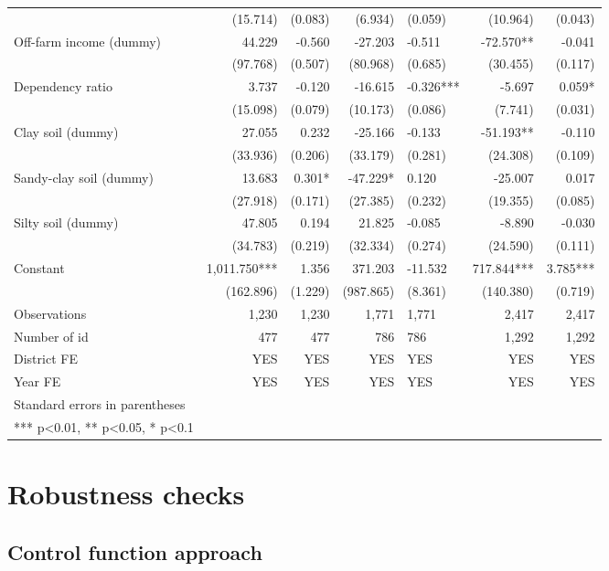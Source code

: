 \documentclass[
]{article}
\begin{document}
\begin{landscape}
\begin{longtable}[t]{lrrrlrr}
 & (15.714) & (0.083) & (6.934) & (0.059) & (10.964) & (0.043)\\
Off-farm income (dummy) & 44.229 & -0.560 & -27.203 & -0.511 & -72.570** & -0.041\\
 & (97.768) & (0.507) & (80.968) & (0.685) & (30.455) & (0.117)\\
Dependency ratio & 3.737 & -0.120 & -16.615 & -0.326*** & -5.697 & 0.059*\\
 & (15.098) & (0.079) & (10.173) & (0.086) & (7.741) & (0.031)\\
Clay soil (dummy) & 27.055 & 0.232 & -25.166 & -0.133 & -51.193** & -0.110\\
 & (33.936) & (0.206) & (33.179) & (0.281) & (24.308) & (0.109)\\
Sandy-clay soil (dummy) & 13.683 & 0.301* & -47.229* & 0.120 & -25.007 & 0.017\\
 & (27.918) & (0.171) & (27.385) & (0.232) & (19.355) & (0.085)\\
Silty soil (dummy) & 47.805 & 0.194 & 21.825 & -0.085 & -8.890 & -0.030\\
 & (34.783) & (0.219) & (32.334) & (0.274) & (24.590) & (0.111)\\
Constant & 1,011.750*** & 1.356 & 371.203 & -11.532 & 717.844*** & 3.785***\\
 & (162.896) & (1.229) & (987.865) & (8.361) & (140.380) & (0.719)\\
Observations & 1,230 & 1,230 & 1,771 & 1,771 & 2,417 & 2,417\\
Number of id & 477 & 477 & 786 & 786 & 1,292 & 1,292\\
District FE & YES & YES & YES & YES & YES & YES\\
Year FE & YES & YES & YES & YES & YES & YES\\
Standard errors in parentheses &  &  &  &  &  & \\
*** p<0.01, ** p<0.05, * p<0.1 &  &  &  &  &  & \\*
\end{longtable}
\endgroup{}
\end{landscape}

\newpage

\hypertarget{robustness-checks}{%
\section{Robustness checks}\label{robustness-checks}}

\newpage

\hypertarget{control-function-approach}{%
\subsection{Control function approach}\label{control-function-approach}}
\end{document}
